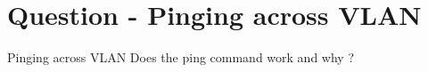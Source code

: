 \section{Question - Pinging across VLAN}

\begin{questionBox}{Pinging across VLAN}
    Does the ping command work and why ?
\end{questionBox}
